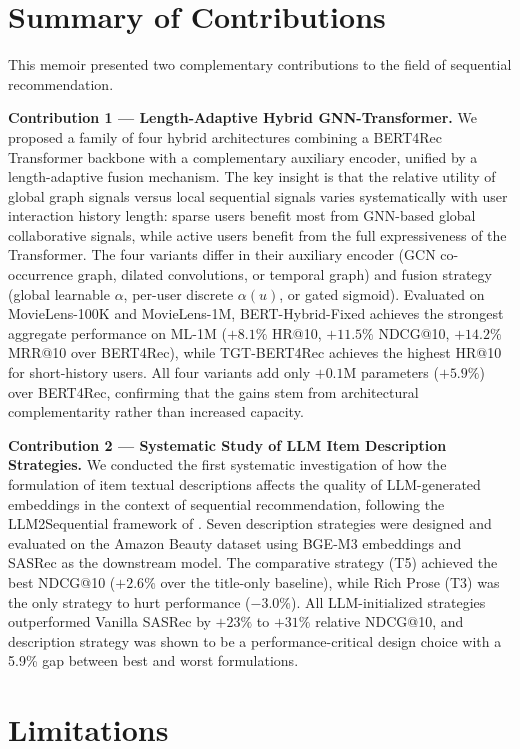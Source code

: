 \documentclass[12pt,a4paper]{report}
\newcommand{\textcite}[1]{\citet{#1}}
\begin{document}
\section*{Summary of Contributions}

This memoir presented two complementary contributions to the field of sequential recommendation.

\medskip
\noindent\textbf{Contribution 1 --- Length-Adaptive Hybrid GNN-Transformer.}
We proposed a family of four hybrid architectures combining a BERT4Rec Transformer backbone with a complementary auxiliary encoder, unified by a length-adaptive fusion mechanism. The key insight is that the relative utility of global graph signals versus local sequential signals varies systematically with user interaction history length: sparse users benefit most from GNN-based global collaborative signals, while active users benefit from the full expressiveness of the Transformer. The four variants differ in their auxiliary encoder (GCN co-occurrence graph, dilated convolutions, or temporal graph) and fusion strategy (global learnable $\alpha$, per-user discrete $\alpha(u)$, or gated sigmoid). Evaluated on MovieLens-100K and MovieLens-1M, BERT-Hybrid-Fixed achieves the strongest aggregate performance on ML-1M (\(+8.1\%\) HR@10, \(+11.5\%\) NDCG@10, \(+14.2\%\) MRR@10 over BERT4Rec), while TGT-BERT4Rec achieves the highest HR@10 for short-history users. All four variants add only $+0.1$M parameters ($+5.9\%$) over BERT4Rec, confirming that the gains stem from architectural complementarity rather than increased capacity.

\medskip
\noindent\textbf{Contribution 2 --- Systematic Study of LLM Item Description Strategies.}
We conducted the first systematic investigation of how the formulation of item textual descriptions affects the quality of LLM-generated embeddings in the context of sequential recommendation, following the LLM2Sequential framework of \textcite{boz2025improving}. Seven description strategies were designed and evaluated on the Amazon Beauty dataset using BGE-M3 embeddings and SASRec as the downstream model. The comparative strategy (T5) achieved the best NDCG@10 ($+2.6\%$ over the title-only baseline), while Rich Prose (T3) was the only strategy to hurt performance ($-3.0\%$). All LLM-initialized strategies outperformed Vanilla SASRec by $+23\%$ to $+31\%$ relative NDCG@10, and description strategy was shown to be a performance-critical design choice with a 5.9\% gap between best and worst formulations.

\section*{Limitations}
\end{document}
